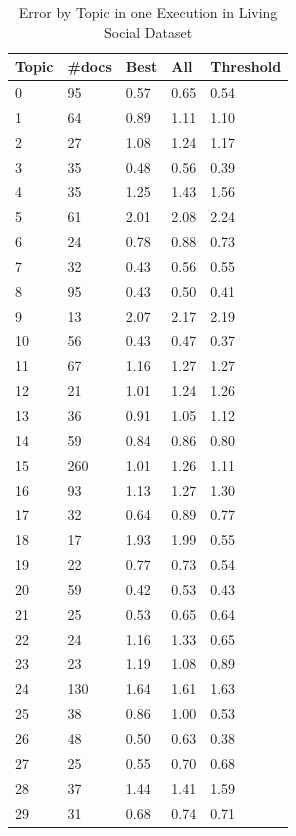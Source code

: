 \documentclass{acm_proc_article-sp}
\begin{document}
\begin{table}[h]
\centering
\label{errortopic}
\caption{Error by Topic in one Execution in Living Social Dataset}
\begin{tabular}{lllll}\hline
Topic & \#docs & Best & All    & Threshold     \\ \hline \hline
0     & 95    & 0.57  & 0.65 & 0.54 \\
1      & 64    & 0.89 & 1.11 & 1.10 \\
2      & 27    & 1.08 & 1.24 & 1.17 \\
3      & 35    & 0.48 & 0.56 & 0.39 \\
4      & 35    & 1.25 & 1.43 & 1.56 \\
5      & 61    & 2.01 & 2.08 & 2.24 \\
6      & 24    & 0.78 & 0.88 & 0.73 \\
7      & 32    & 0.43 & 0.56 & 0.55 \\
8      & 95    & 0.43 & 0.50 & 0.41 \\
9      & 13    & 2.07 & 2.17 & 2.19 \\
10     & 56    & 0.43 & 0.47 & 0.37 \\
11     & 67    & 1.16 & 1.27 & 1.27 \\
12     & 21    & 1.01 & 1.24 & 1.26 \\
13     & 36    & 0.91 & 1.05 & 1.12 \\
14     & 59    & 0.84 & 0.86 & 0.80 \\
15     & 260   & 1.01 & 1.26 & 1.11 \\
16     & 93    & 1.13 & 1.27 & 1.30 \\
17     & 32    & 0.64 & 0.89 & 0.77 \\
18     & 17    & 1.93 & 1.99 & 0.55 \\
19     & 22    & 0.77 & 0.73 & 0.54 \\
20     & 59    & 0.42 & 0.53 & 0.43 \\
21     & 25    & 0.53 & 0.65 & 0.64 \\
22     & 24    & 1.16 & 1.33 & 0.65 \\
23     & 23    & 1.19 & 1.08 & 0.89 \\
24     & 130   & 1.64 & 1.61 & 1.63 \\
25     & 38    & 0.86 & 1.00 & 0.53 \\
26     & 48    & 0.50 & 0.63 & 0.38 \\
27     & 25    & 0.55 & 0.70 & 0.68 \\
28     & 37    & 1.44 & 1.41 & 1.59 \\
29     & 31    & 0.68 & 0.74 & 0.71 \\ \hline
\end{tabular}
\end{table}
\end{document}
